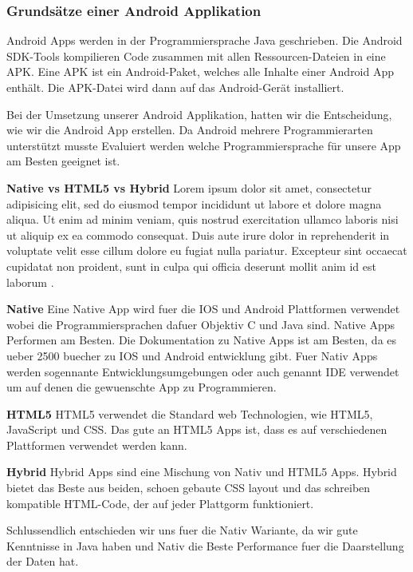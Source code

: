 \subsubsection{Grundsätze einer Android Applikation}
\label{subsec:aapp-fundam}

Android Apps werden in der Programmiersprache Java geschrieben.
Die Android SDK-Tools kompilieren Code zusammen mit allen Ressourcen-Dateien in eine APK.
Eine APK ist ein Android-Paket, welches alle Inhalte einer Android App enthält. 
Die APK-Datei wird dann auf das Android-Gerät installiert. 

Bei der Umsetzung unserer Android Applikation, hatten wir die Entscheidung, wie wir die Android App erstellen. 
Da Android mehrere Programmierarten unterstützt musste Evaluiert werden welche Programmiersprache für unsere App am Besten geeignet ist. \nextline

\textbf{Native vs HTML5 vs Hybrid}
Lorem ipsum dolor sit amet, consectetur adipisicing elit, sed do eiusmod
tempor incididunt ut labore et dolore magna aliqua. Ut enim ad minim veniam,
quis nostrud exercitation ullamco laboris nisi ut aliquip ex ea commodo
consequat. Duis aute irure dolor in reprehenderit in voluptate velit esse
cillum dolore eu fugiat nulla pariatur. Excepteur sint occaecat cupidatat non
proident, sunt in culpa qui officia deserunt mollit anim id est laborum \cite{FAIF.CH2-android-dev.NativeWeborHybrid}. 

\textbf{Native\newline} 
Eine Native App wird fuer die IOS und Android Plattformen verwendet wobei die Programmiersprachen dafuer Objektiv C und Java sind.
Native Apps Performen am Besten.
Die Dokumentation zu Native Apps ist am Besten, da es ueber 2500 buecher zu IOS und Android entwicklung gibt.
Fuer Nativ Apps werden sogennante Entwicklungsumgebungen oder auch genannt IDE verwendet um auf denen die gewuenschte App zu Programmieren.\nextline

\textbf{HTML5\newline} 
HTML5 verwendet die Standard web Technologien, wie HTML5, JavaScript und CSS. Das gute an HTML5 Apps ist, dass es auf verschiedenen Plattformen verwendet werden kann.\nextline

\textbf{Hybrid\newline} 
Hybrid Apps sind eine Mischung von Nativ und HTML5 Apps. Hybrid bietet das Beste aus beiden, schoen gebaute CSS layout und das schreiben kompatible HTML-Code, der auf jeder Plattgorm funktioniert.\nextline

Schlussendlich entschieden wir uns fuer die Nativ Wariante, da wir gute Kenntnisse in Java haben und Nativ die Beste Performance fuer die Daarstellung der Daten hat.
\clearpage %